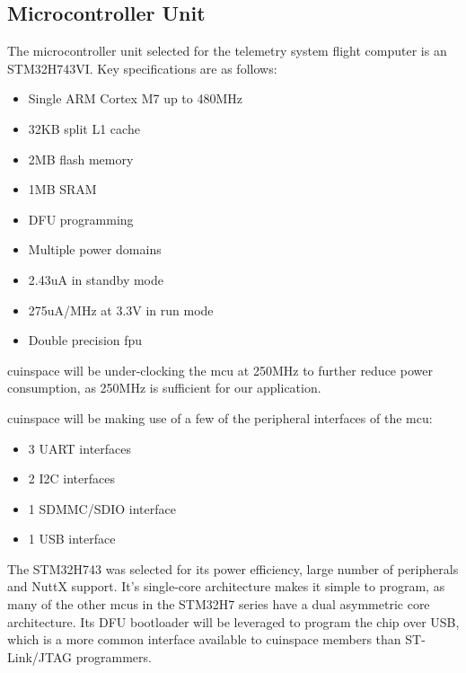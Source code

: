 \subsection{Microcontroller Unit}

The microcontroller unit selected for the telemetry system flight computer is an STM32H743VI. Key specifications are as
follows:

\begin{itemize}
    \item Single ARM Cortex M7 up to 480MHz \cite[1]{stm32h743vi}
    \item 32KB split L1 cache \cite[1]{stm32h743vi}
    \item 2MB flash memory \cite[1]{stm32h743vi}
    \item 1MB SRAM \cite[1]{stm32h743vi}
    \item DFU programming \cite[Sec. 3.4]{stm32h743vi}
    \item Multiple power domains \cite[1]{stm32h743vi}
    \item 2.43uA in standby mode \cite[1]{stm32h743vi}
    \item 275uA/MHz at 3.3V in run mode \cite[1]{stm32h743vi}
    \item Double precision \gls{fpu} \cite[1]{stm32h743vi}
\end{itemize}

\Gls{cuinspace} will be under-clocking the \gls{mcu} at 250MHz to further reduce power consumption, as 250MHz is sufficient for our
application.

\Gls{cuinspace} will be making use of a few of the peripheral interfaces of the \gls{mcu}:

\begin{itemize}
    \item 3 UART interfaces
    \item 2 I2C interfaces
    \item 1 SDMMC/SDIO interface
    \item 1 USB interface
\end{itemize}

The STM32H743 was selected for its power efficiency, large number of peripherals and NuttX support. It's single-core
architecture makes it simple to program, as many of the other \glspl{mcu} in the STM32H7 series have a dual asymmetric
core architecture. Its DFU bootloader will be leveraged to program the chip over USB, which is a more common interface
available to \gls{cuinspace} members than ST-Link/JTAG programmers.

